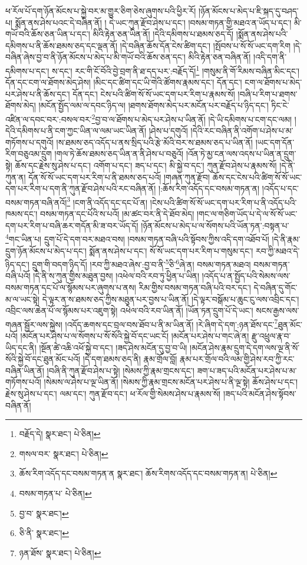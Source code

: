 ཕ་རོལ་པོ་དག་ཉོན་མོངས་པ་སྐྱེ་བར་མ་གྱུར་ཅིག་ཅེས་ཞུགས་པའི་ཕྱིར་རོ། །ཉོན་མོངས་པ་མེད་པ་ཇི་སྐད་དུ་བཤད་པ། སྨོན་ནས་ཤེས་པའང་དེ་བཞིན་ནོ། །
དེ་ཡང་ཀུན་རྫོབ་ཤེས་པ་དང་། །བསམ་གཏན་གྱི་མཐའ་ན་ཡོད་པ་དང་། མི་གཡོ་བའི་ཆོས་ཅན་ཡིན་པ་དང་། མིའི་རྟེན་ཅན་ཡིན་ནོ། །དེའི་དམིགས་པ་ཐམས་ཅད་དོ། །སྨོན་ནས་ཤེས་པའི་དམིགས་པ་ནི་ཆོས་ཐམས་ཅད་དང་ལྡན་ནོ། །དེ་བཞིན་ཆོས་དོན་ངེས་ཚིག་དང་། །སྤོབས་པ་སོ་སོ་ཡང་དག་རིག །དེ་བཞིན་ཞེས་བྱ་བ་ནི་ཉོན་མོངས་པ་མེད་པ་མི་གཡོ་བའི་ཆོས་ཅན་དང་། མིའི་རྟེན་ཅན་བཞིན་ནོ། །འདི་དག་ནི་དམིགས་པ་དང་། ས་དང་། རང་གི་ངོ་བོའི་བྱེ་བྲག་ནི་ཐ་དད་པར་:བརྗོད་དོ།\footnote{བརྗོད་དེ།  སྣར་ཐང་།  པེ་ཅིན། } །གསུམ་ནི་གོ་རིམས་བཞིན་མིང་དང་། དོན་དང་ངག་ལ་ཐོགས་མེད་ཤེས། །མིང་དང་ཚིག་དང་ཡི་གེའི་ཚོགས་རྣམས་དང་། དོན་དང་། ངག་ལ་ཐོགས་པ་མེད་པར་ཤེས་པ་ནི་ཆོས་དང་། དོན་དང་། ངེས་པའི་ཚིག་སོ་སོ་ཡང་དག་པར་རིག་པ་རྣམས་སོ། །བཞི་པ་རིག་པ་ཐགས་ཐོགས་མེད། །མངོན་སྤྱོད་ལམ་ལ་དབང་ཉིད་ལ། །ཐགས་ཐོགས་མེད་པར་མངོན་པར་བརྗོད་པ་ཉིད་དང་། ཏིང་ངེ་འཛིན་ལ་དབང་བར་:བསལ་བར་\footnote{གསལ་བར་  སྣར་ཐང་།  པེ་ཅིན། }བྱ་བ་ལ་ཐོགས་པ་མེད་པར་ཤེས་པ་ཡིན་ནོ། །དེ་ཡི་དམིགས་པ་ངག་དང་ལམ། །དེའི་དམིགས་པ་ནི་ངག་ཀྱང་ཡིན་ལ་ལམ་ཡང་ཡིན་ནོ། །ཤེས་པ་དགུའོ། །དེའི་རང་བཞིན་ནི་འགོག་པ་ཤེས་པ་མ་གཏོགས་པ་དགུའོ། །ས་ཐམས་ཅད་འདོད་པ་ནས་སྲིད་པའི་རྩེ་མོའི་བར་ས་ཐམས་ཅད་པ་ཡིན་ནོ། །ཡང་དག་དོན་རིག་བཅུའམ་དྲུག །གལ་ཏེ་ཆོས་ཐམས་ཅད་ཡིན་ན་ནི་ཤེས་པ་བཅུའོ། །འོན་ཏེ་མྱ་ངན་ལས་འདས་པ་ཡིན་ན་དྲུག་སྟེ། ཆོས་དང་རྗེས་སུ་ཤེས་པ་དང་། འགོག་པ་དང་། ཟད་པ་དང་། མི་སྐྱེ་བ་དང་། ཀུན་རྫོབ་ཤེས་པ་རྣམས་སོ། །དེ་ནི་ཀུན་ན། དོན་སོ་སོ་ཡང་དག་པར་རིག་པ་ནི་ཐམས་ཅད་པའོ། །གཞན་ཀུན་རྫོབ། ཆོས་དང་ངེས་པའི་ཚིག་སོ་སོ་ཡང་དག་པར་རིག་པ་དག་ནི་ཀུན་རྫོབ་ཤེས་པའི་རང་བཞིན་ནོ། །:ཆོས་རིག་འདོད་དང་བསམ་གཏན་ན། །འདོད་པ་དང་བསམ་གཏན་བཞི་ནའོ།\footnote{ཆོས་རིག་འདོད་དང་བསམ་གཏན་ན  སྣར་ཐང་། ཆོས་རིགས་འདོད་དང་བསམ་གཏན་ན།  པེ་ཅིན། } །ངག་ནི་འདོད་དང་དང་པོ་ན། །ངེས་པའི་ཚིག་སོ་སོ་ཡང་དག་པར་རིག་པ་ནི་འདོད་པའི་ཁམས་དང་། བསམ་གཏན་དང་པོའི་ས་པའོ། །མ་ཚང་བར་ནི་དེ་ཐོབ་མེད། །གང་ལ་གཅིག་ཡོད་པ་དེ་ལ་སོ་སོ་ཡང་དག་པར་རིག་པ་བཞི་ཆར་གདོན་མི་ཟ་བར་ཡོད་དོ། །ཉོན་མོངས་པ་མེད་པ་ལ་སོགས་པའི་ཡོན་ཏན་:བསྟན་པ་\footnote{བསམ་གཏན་པ་  པེ་ཅིན། }གང་ཡིན་པ། དྲུག་པོ་དེ་དག་བར་མཐའ་བས། །བསམ་གཏན་བཞི་པའི་སྟོབས་ཀྱིས་འདི་དག་འཐོབ་པོ། །དེ་ནི་རྣམ་དྲུག་ཉོན་མོངས་པ་མེད་པ་དང་། སྨོན་ནས་ཤེས་པ་དང་། སོ་སོ་ཡང་དག་པར་རིག་པ་གསུམ་དང་། རབ་ཀྱི་མཐའ་དེ་ཉིད་དང་། དྲུག་གི་བདག་ཉིད་དོ། །རབ་ཀྱི་མཐའ་ཞེས་:བྱ་བ་ནི་\footnote{བྱ་བ་  སྣར་ཐང་། }ཅི་\footnote{ཅི་ནི་  སྣར་ཐང་། }ཞེ་ན། བསམ་གཏན་མཐའ། བསམ་གཏན་བཞི་པའོ། །དེ་ནི་ས་ཀུན་གྱིས་མཐུན་བྱས། །འཕེལ་བའི་རབ་ཏུ་ཕྱིན་པ་ཡིན། །འདོད་པ་ན་སྤྱོད་པའི་སེམས་ལས་བསམ་གཏན་དང་པོ་ལ་སྙོམས་པར་ཞུགས་པ་ནས། རིམ་གྱིས་བསམ་གཏན་བཞི་པའི་བར་དང་། དེ་བཞིན་དུ་གོང་མ་ལ་ཡང་སྟེ། དེ་ལྟར་ན་ས་ཐམས་ཅད་ཀྱིས་མཐུན་པར་བྱས་པ་ཡིན་ནོ། །དེ་ལྟར་བསྒོམ་པ་ཆུང་ངུ་ལས་འབྲིང་དང་། འབྲིང་ལས་ཆེན་པོ་ལ་སྙོམས་པར་འཇུག་སྟེ། འཕེལ་བའི་རབ་ཡིན་ནོ། །ཡོན་ཏན་དྲུག་པོ་དེ་ཡང་། སངས་རྒྱས་ལས་གཞན་སྦྱོར་ལས་སྐྱེས། །འདོད་ཆགས་དང་བྲལ་བས་ཐོབ་པ་ནི་མ་ཡིན་ནོ། །རེ་ཞིག་དེ་དག་:ཉན་ཐོས་དང་\footnote{ཉན་ཐོས་  སྣར་ཐང་།  པེ་ཅིན། }ཐུན་མོང་པའོ། །མངོན་པར་ཤེས་པ་ལ་སོགས་པ་སོ་སོའི་སྐྱེ་བོ་དང་ཡང་ངོ། །མངོན་པར་ཤེས་པ་གང་ཞེ་ན། རྫུ་འཕྲུལ་རྣ་བ་ཡིད་དང་ནི། །སྔོན་ཚེ་འཆི་འཕོ་སྐྱེ་བ་དང་། །ཟད་ཤེས་མངོན་དུ་བྱ་བ་ཡི། །མངོན་ཤེས་རྣམ་དྲུག་དེ་དག་ལས་ལྔ་ནི་སོ་སོའི་སྐྱེ་བོ་དང་ཐུན་མོང་པའོ། །དེ་དག་ཐམས་ཅད་ནི། རྣམ་གྲོལ་བློ། རྣམ་པར་གྲོལ་བའི་ལམ་གྱི་ཤེས་རབ་ཀྱི་རང་བཞིན་ཡིན་ནོ། །བཞི་ནི་ཀུན་རྫོབ་ཤེས་པ་སྟེ། །སེམས་ཀྱི་རྣམ་གྲངས་དང་། ཟག་པ་ཟད་པའི་མངོན་པར་ཤེས་པ་མ་གཏོགས་པའོ། །སེམས་ལ་ཤེས་པ་ལྔ་ཡིན་ནོ། །སེམས་ཀྱི་རྣམ་གྲངས་མངོན་པར་ཤེས་པ་ནི་ལྔ་སྟེ། ཆོས་ཤེས་པ་དང་། རྗེས་སུ་ཤེས་པ་དང་། ལམ་དང་། ཀུན་རྫོབ་དང་། ཕ་རོལ་གྱི་སེམས་ཤེས་པ་རྣམས་སོ། །ཟད་པའི་མངོན་ཤེས་སྟོབས་བཞིན་ནོ། 